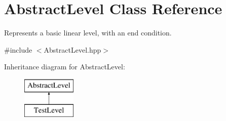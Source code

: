 \hypertarget{class_abstract_level}{}\section{Abstract\+Level Class Reference}
\label{class_abstract_level}


Represents a basic linear level, with an end condition.  




{\ttfamily \#include $<$Abstract\+Level.\+hpp$>$}

Inheritance diagram for Abstract\+Level\+:\begin{figure}[H]
\begin{center}
\leavevmode
\includegraphics[height=2.000000cm]{class_abstract_level}
\end{center}
\end{figure}
